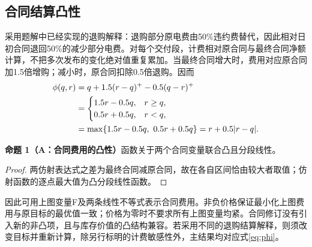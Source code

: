 \documentclass[UTF8,a4paper,zihao=-4,fontset=mac]{ctexart}
\newcommand{\pp}[2]{\par\noindent\textbf{命题 #1（#2）}\quad}
\begin{document}
\subsection{合同结算凸性}
采用题解中已经实现的退购解释：退购部分原电费由50\%违约费替代，因此相对日初合同退回50\%的减少部分电费。对每个交付段，计费相对原合同与最终合同净额计算，不把多次发布的变化绝对值重复累加。当最终合同增大时，费用对应原合同加1.5倍增购；减小时，原合同扣除0.5倍退购。因而
\begin{align}
 \phi(q,r)&=q+1.5(r-q)^+-0.5(q-r)^+\notag\\
 &=\begin{cases}1.5r-0.5q,&r\ge q,\\0.5r+0.5q,&r<q,\end{cases}\label{eq:phi}\\
 &=\max\{1.5r-0.5q,\ 0.5r+0.5q\}=r+0.5|r-q|.\notag
\end{align}
\pp{1}{A：合同费用的凸性}函数关于两个合同变量联合凸且分段线性。
\begin{proof}
两仿射表达式之差为最终合同减原合同，故在各自区间恰由较大者取值；仿射函数的逐点最大值为凸分段线性函数。
\end{proof}
因此可用上图变量F及两条线性不等式表示合同费用。非负价格保证最小化上图费用与原目标的最优值一致；价格为零时不要求所有上图变量均紧。合同修订没有引入新的非凸项，且与库存价值的凸结构兼容。若采用不同的退购结算解释，则须改变目标并重新计算，除另行标明的计费敏感性外，主结果均对应式\eqref{eq:phi}。


\end{document}
